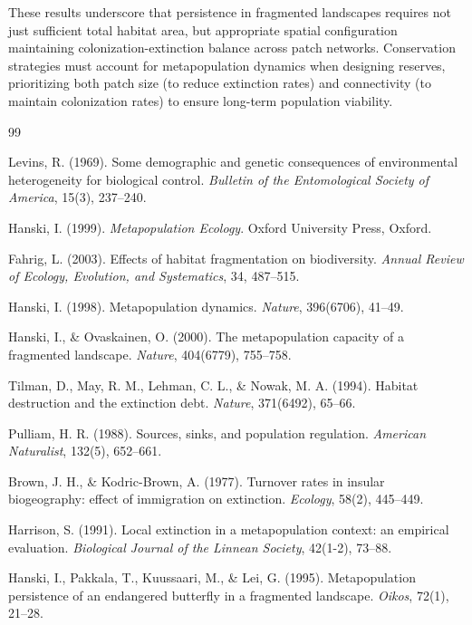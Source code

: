 \documentclass[11pt,a4paper]{article}
\begin{document}
These results underscore that persistence in fragmented landscapes requires not just sufficient total habitat area, but appropriate spatial configuration maintaining colonization-extinction balance across patch networks. Conservation strategies must account for metapopulation dynamics when designing reserves, prioritizing both patch size (to reduce extinction rates) and connectivity (to maintain colonization rates) to ensure long-term population viability.


\begin{thebibliography}{99}

Levins, R. (1969). Some demographic and genetic consequences of environmental heterogeneity for biological control. \textit{Bulletin of the Entomological Society of America}, 15(3), 237--240.

Hanski, I. (1999). \textit{Metapopulation Ecology}. Oxford University Press, Oxford.

Fahrig, L. (2003). Effects of habitat fragmentation on biodiversity. \textit{Annual Review of Ecology, Evolution, and Systematics}, 34, 487--515.

Hanski, I. (1998). Metapopulation dynamics. \textit{Nature}, 396(6706), 41--49.

Hanski, I., \& Ovaskainen, O. (2000). The metapopulation capacity of a fragmented landscape. \textit{Nature}, 404(6779), 755--758.

Tilman, D., May, R. M., Lehman, C. L., \& Nowak, M. A. (1994). Habitat destruction and the extinction debt. \textit{Nature}, 371(6492), 65--66.

Pulliam, H. R. (1988). Sources, sinks, and population regulation. \textit{American Naturalist}, 132(5), 652--661.

Brown, J. H., \& Kodric-Brown, A. (1977). Turnover rates in insular biogeography: effect of immigration on extinction. \textit{Ecology}, 58(2), 445--449.

Harrison, S. (1991). Local extinction in a metapopulation context: an empirical evaluation. \textit{Biological Journal of the Linnean Society}, 42(1-2), 73--88.

Hanski, I., Pakkala, T., Kuussaari, M., \& Lei, G. (1995). Metapopulation persistence of an endangered butterfly in a fragmented landscape. \textit{Oikos}, 72(1), 21--28.


\end{thebibliography}
\end{document}
